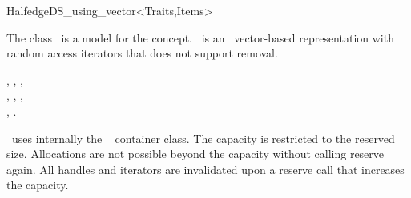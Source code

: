 
\ccRefPageBegin



\begin{ccRefClass}{HalfedgeDS_using_vector<Traits,Items>}

\ccDefinition
  
The class \ccRefName\ is a model for the  concept.
\ccRefName\ is an \stl\ vector-based representation with random
access iterators that does not support removal.


\ccIsModel


\ccTypes
{}

\ccGlue
{}

\ccSeeAlso

, 
, 
,\\
,
,
,\\
,
.


\ccImplementation

\ccRefName\ uses internally the \stl\  container
class.  The capacity is restricted to the reserved size. Allocations
are not possible beyond the capacity without calling reserve again.
All handles and iterators are invalidated upon a reserve call that
increases the capacity.

\end{ccRefClass}

\ccRefPageEnd

